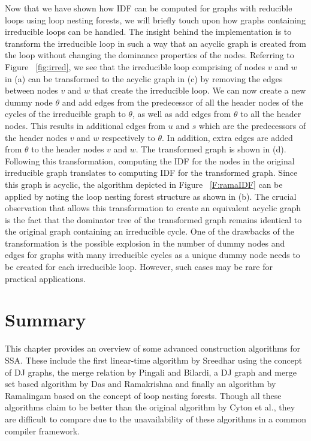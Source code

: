 {    Now that we have shown how IDF can be computed for graphs with reducible loops using 
    loop nesting forests, we will briefly touch
    upon how graphs containing irreducible loops can be handled. The insight behind the implementation
    is to transform the irreducible loop in such a way that an acyclic graph is created from the loop
    without changing the dominance properties of the nodes. Referring to Figure ~\ref{fig:irred}, we see 
    that the irreducible loop comprising of nodes $v$ and $w$ in (a) can be transformed to the acyclic
    graph in (c) by removing the edges between nodes $v$ and $w$ that create the irreducible loop. 
    We can now create a new dummy node $\theta$ and add edges from the predecessor of all
    the header nodes of the cycles of the irreducible graph to $\theta$, 
    as well as add edges from $\theta$ to all the 
    header nodes. This results in additional edges from $u$ and $s$ which are the predecessors of the
    header nodes $v$ and $w$ respectively to $\theta$. In addition, extra edges are added from $\theta$
    to the header nodes $v$ and $w$. The transformed graph is shown in (d). Following this transformation, 
    computing the IDF for the nodes 
    in the original irreducible graph translates to computing IDF for the transformed graph. Since this
    graph is acyclic, the algorithm depicted in Figure ~\ref{F:ramaIDF} can be applied by noting the
    loop nesting forest structure as shown in (b). The crucial observation that allows this transformation 
    to create an equivalent acyclic
    graph is the fact that the dominator tree of the transformed graph remains identical to the
    original graph containing an irreducible cycle. One of the drawbacks of the transformation is the
    possible explosion in the number of dummy nodes and edges for graphs with many irreducible cycles as
    a unique dummy node needs to be created for each irreducible loop. However, such cases may be rare
    for practical applications.

    \section{Summary}
    This chapter provides an overview of some advanced construction algorithms for SSA. These include the first  linear-time algorithm by Sreedhar using the concept of DJ graphs, the merge relation by Pingali and Bilardi, a DJ graph and merge set based algorithm by Das and Ramakrishna and finally an algorithm by Ramalingam based on the concept of loop nesting forests. Though all these algorithms claim to be better than the original algorithm by Cyton et al., they are difficult to compare due to the unavailability of these algorithms in a common compiler framework. 

}
